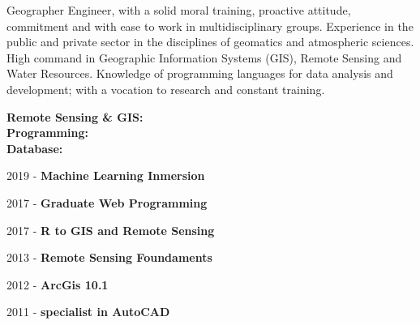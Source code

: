 \justify
Geographer Engineer, with a solid moral training, proactive attitude, commitment and with ease to work in multidisciplinary groups. Experience in the public and private sector in the disciplines of geomatics and atmospheric sciences. High command in Geographic Information Systems (GIS), Remote Sensing and Water Resources. Knowledge of programming languages for data analysis and development; with a vocation to research and constant training.






\textbf{Remote Sensing \& GIS:}\\
\divider\smallskip
\textbf{Programming:}\\
\cvtag{\LaTeX}
\divider\smallskip
\textbf{Database:}\\



\item 2019 - \textbf{Machine Learning Inmersion}
\item 2017 - \textbf{Graduate Web Programming}
\item 2017 - \textbf{R to GIS and Remote Sensing}
\item 2013 - \textbf{Remote Sensing Foundaments}
\item 2012 - \textbf{ArcGis 10.1}
\item 2011 - \textbf{specialist in AutoCAD}

\divider